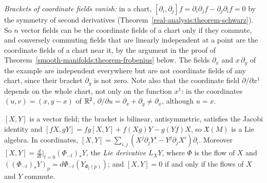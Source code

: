 \emph{Brackets of coordinate fields vanish:} in a chart, $[\partial_i, \partial_j]f = \partial_i\partial_jf - \partial_j\partial_if = 0$ by the symmetry of second derivatives
(Theorem~\ref{real-analysis:theorem-schwarz}). So $n$ vector fields can be the coordinate fields of a chart only if they commute, and conversely commuting fields that are linearly independent
at a point are the coordinate fields of a chart near it, by the argument in the proof of Theorem~\ref{smooth-manifolds:theorem-frobenius} below. The fields $\partial_x$ and $x\,\partial_y$ of the
example are independent everywhere but are not coordinate fields of any chart, since their bracket $\partial_y$ is not zero. Note also that the coordinate field $\partial/\partial x^1$ depends on the
whole chart, not only on the function $x^1$: in the coordinates $(u, v) = (x, y - x)$ of $\mathbb{R}^2$, $\partial/\partial u = \partial_x + \partial_y \neq \partial_x$, although $u = x$.

\begin{proposition}\label{smooth-manifolds:proposition-bracket}
$[X, Y]$ is a vector field; the bracket is bilinear, antisymmetric, satisfies the Jacobi identity and $[fX, gY] = fg[X, Y] + f(Xg)Y - g(Yf)X$, so $\mathfrak{X}(M)$ is a Lie algebra. In coordinates,
$[X, Y] = \sum_{i,j}(X^j\partial_jY^i - Y^j\partial_jX^i)\partial_i$. Moreover $[X, Y] = \frac{d}{dt}\Big|_{t=0}(\Phi_{-t})_*Y$, the \emph{Lie derivative} $L_XY$,
where $\Phi$ is the flow of $X$ and $((\Phi_{-t})_*Y)_p = d\Phi_{-t}(Y_{\Phi_t(p)})$; and $[X, Y] = 0$ if and only if the flows of $X$ and $Y$ commute.
\end{proposition}

